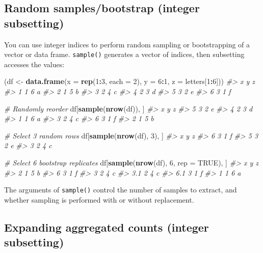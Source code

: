 \documentclass[]{book}
\newenvironment{Shaded}{\begin{snugshade}}{\end{snugshade}}
\newcommand{\KeywordTok}[1]{\textcolor[rgb]{0.13,0.29,0.53}{\textbf{#1}}}
\newcommand{\DataTypeTok}[1]{\textcolor[rgb]{0.13,0.29,0.53}{#1}}
\newcommand{\DecValTok}[1]{\textcolor[rgb]{0.00,0.00,0.81}{#1}}
\newcommand{\StringTok}[1]{\textcolor[rgb]{0.31,0.60,0.02}{#1}}
\newcommand{\CommentTok}[1]{\textcolor[rgb]{0.56,0.35,0.01}{\textit{#1}}}
\newcommand{\OtherTok}[1]{\textcolor[rgb]{0.56,0.35,0.01}{#1}}
\newcommand{\OperatorTok}[1]{\textcolor[rgb]{0.81,0.36,0.00}{\textbf{#1}}}
\newcommand{\NormalTok}[1]{#1}
\theoremstyle{definition}
\theoremstyle{definition}
\theoremstyle{definition}
\theoremstyle{remark}
\begin{document}
\subsection{Random samples/bootstrap (integer
subsetting)}\label{random-samplesbootstrap-integer-subsetting}

You can use integer indices to perform random sampling or bootstrapping
of a vector or data frame. \texttt{sample()} generates a vector of
indices, then subsetting accesses the values:

\begin{Shaded}
\begin{Highlighting}[]
\NormalTok{(df <-}\StringTok{ }\KeywordTok{data.frame}\NormalTok{(}\DataTypeTok{x =} \KeywordTok{rep}\NormalTok{(}\DecValTok{1}\OperatorTok{:}\DecValTok{3}\NormalTok{, }\DataTypeTok{each =} \DecValTok{2}\NormalTok{), }\DataTypeTok{y =} \DecValTok{6}\OperatorTok{:}\DecValTok{1}\NormalTok{, }\DataTypeTok{z =}\NormalTok{ letters[}\DecValTok{1}\OperatorTok{:}\DecValTok{6}\NormalTok{]))}
\CommentTok{#>   x y z}
\CommentTok{#> 1 1 6 a}
\CommentTok{#> 2 1 5 b}
\CommentTok{#> 3 2 4 c}
\CommentTok{#> 4 2 3 d}
\CommentTok{#> 5 3 2 e}
\CommentTok{#> 6 3 1 f}

\CommentTok{# Randomly reorder}
\NormalTok{df[}\KeywordTok{sample}\NormalTok{(}\KeywordTok{nrow}\NormalTok{(df)), ]}
\CommentTok{#>   x y z}
\CommentTok{#> 5 3 2 e}
\CommentTok{#> 4 2 3 d}
\CommentTok{#> 1 1 6 a}
\CommentTok{#> 3 2 4 c}
\CommentTok{#> 6 3 1 f}
\CommentTok{#> 2 1 5 b}

\CommentTok{# Select 3 random rows}
\NormalTok{df[}\KeywordTok{sample}\NormalTok{(}\KeywordTok{nrow}\NormalTok{(df), }\DecValTok{3}\NormalTok{), ]}
\CommentTok{#>   x y z}
\CommentTok{#> 6 3 1 f}
\CommentTok{#> 5 3 2 e}
\CommentTok{#> 3 2 4 c}

\CommentTok{# Select 6 bootstrap replicates}
\NormalTok{df[}\KeywordTok{sample}\NormalTok{(}\KeywordTok{nrow}\NormalTok{(df), }\DecValTok{6}\NormalTok{, }\DataTypeTok{rep =} \OtherTok{TRUE}\NormalTok{), ]}
\CommentTok{#>     x y z}
\CommentTok{#> 2   1 5 b}
\CommentTok{#> 6   3 1 f}
\CommentTok{#> 3   2 4 c}
\CommentTok{#> 3.1 2 4 c}
\CommentTok{#> 6.1 3 1 f}
\CommentTok{#> 1   1 6 a}
\end{Highlighting}
\end{Shaded}

The arguments of \texttt{sample()} control the number of samples to
extract, and whether sampling is performed with or without replacement.

\subsection{Expanding aggregated counts (integer
subsetting)}\label{expanding-aggregated-counts-integer-subsetting}
\end{document}

